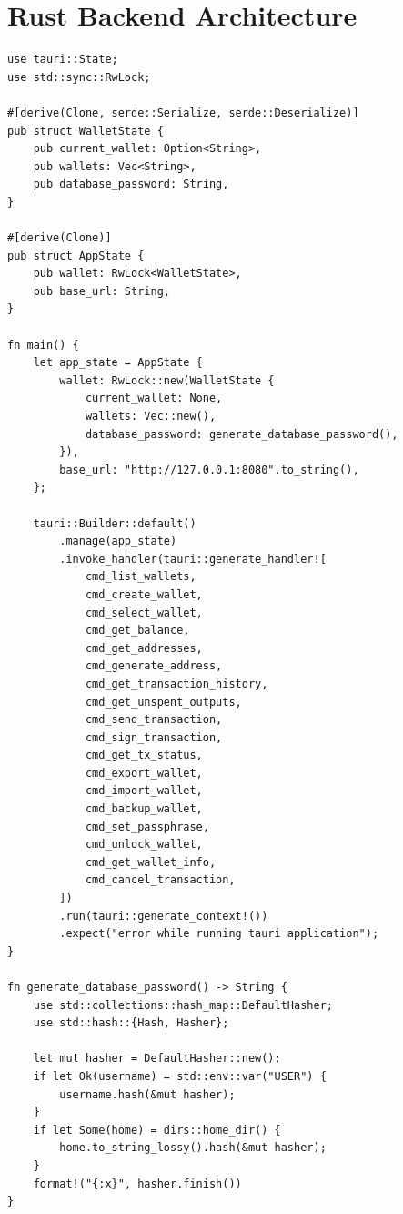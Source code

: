\section{Rust Backend Architecture}
\label{sec:ch19-rust-backend}

\begin{listing}[H]
\caption{Tauri wallet main ()}
\label{lst:ch19-main}
\begin{verbatim}
use tauri::State;
use std::sync::RwLock;

#[derive(Clone, serde::Serialize, serde::Deserialize)]
pub struct WalletState {
    pub current_wallet: Option<String>,
    pub wallets: Vec<String>,
    pub database_password: String,
}

#[derive(Clone)]
pub struct AppState {
    pub wallet: RwLock<WalletState>,
    pub base_url: String,
}

fn main() {
    let app_state = AppState {
        wallet: RwLock::new(WalletState {
            current_wallet: None,
            wallets: Vec::new(),
            database_password: generate_database_password(),
        }),
        base_url: "http://127.0.0.1:8080".to_string(),
    };

    tauri::Builder::default()
        .manage(app_state)
        .invoke_handler(tauri::generate_handler![
            cmd_list_wallets,
            cmd_create_wallet,
            cmd_select_wallet,
            cmd_get_balance,
            cmd_get_addresses,
            cmd_generate_address,
            cmd_get_transaction_history,
            cmd_get_unspent_outputs,
            cmd_send_transaction,
            cmd_sign_transaction,
            cmd_get_tx_status,
            cmd_export_wallet,
            cmd_import_wallet,
            cmd_backup_wallet,
            cmd_set_passphrase,
            cmd_unlock_wallet,
            cmd_get_wallet_info,
            cmd_cancel_transaction,
        ])
        .run(tauri::generate_context!())
        .expect("error while running tauri application");
}

fn generate_database_password() -> String {
    use std::collections::hash_map::DefaultHasher;
    use std::hash::{Hash, Hasher};

    let mut hasher = DefaultHasher::new();
    if let Ok(username) = std::env::var("USER") {
        username.hash(&mut hasher);
    }
    if let Some(home) = dirs::home_dir() {
        home.to_string_lossy().hash(&mut hasher);
    }
    format!("{:x}", hasher.finish())
}
\end{verbatim}
\end{listing}

